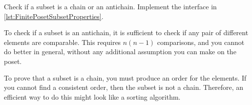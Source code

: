 
\begin{codeexercise}
    Check if a subset is a chain or an antichain.
    Implement the interface in \cref{lst:FinitePosetSubsetProperties}.
\end{codeexercise}


\begin{hint}
    To check if a subset is an antichain, it is sufficient to check if any pair of different elements are comparable.
    This requires $n(n-1)$ comparisons, and you cannot do better in general, without any additional assumption you can make on the poset.
\end{hint}

\begin{hint}
    To prove that a subset is a chain, you must produce an order for the elements.
    If you cannot find a consistent order, then the subset is not a chain.
    Therefore, an efficient way to do this might look like a sorting algorithm.
\end{hint}